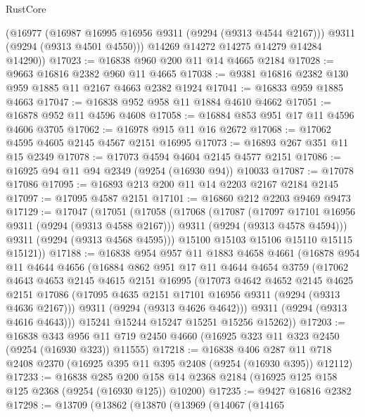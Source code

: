 \begin{lexlean}{RustCore}
\begin{coremodule}
        (@16977
          (@16987 @16995 @16956 @9311 (@9294 (@9313 @4544 @2167)))
          @9311
          (@9294 (@9313 @4501 @4550)))
        @14269
        @14272
        @14275
        @14279
        @14284
        @14290))
@17023 := @16838 @960 @200 @11 @14 @4665 @2184
@17028 := @9663 @16816 @2382 @960 @11 @4665
@17038 := @9381 @16816 @2382 @130 @959 @1885 @11 @2167 @4663 @2382 @1924
@17041 := @16833 @959 @1885 @4663
@17047 := @16838 @952 @958 @11 @1884 @4610 @4662
@17051 := @16878 @952 @11 @4596 @4608
@17058 := @16884 @853 @951 @17 @11 @4596 @4606 @3705
@17062 := @16978 @915 @11 @16 @2672
@17068 := @17062 @4595 @4605 @2145 @4567 @2151 @16995
@17073 := @16893 @267 @351 @11 @15 @2349
@17078 := @17073 @4594 @4604 @2145 @4577 @2151
@17086 := @16925 @94 @11 @94 @2349 (@9254 (@16930 @94)) @10033
@17087 := @17078 @17086
@17095 := @16893 @213 @200 @11 @14 @2203 @2167 @2184 @2145
@17097 := @17095 @4587 @2151
@17101 := @16860 @212 @2203 @9469 @9473
@17129 := @17047
    (@17051
      (@17058
        (@17068
          (@17087
            (@17097 @17101 @16956 @9311 (@9294 (@9313 @4588 @2167)))
            @9311
            (@9294 (@9313 @4578 @4594)))
          @9311
          (@9294 (@9313 @4568 @4595)))
        @15100
        @15103
        @15106
        @15110
        @15115
        @15121))
@17188 := @16838
    @954
    @957
    @11
    @1883
    @4658
    @4661
    (@16878
      @954
      @11
      @4644
      @4656
      (@16884
        @862
        @951
        @17
        @11
        @4644
        @4654
        @3759
        (@17062
          @4643
          @4653
          @2145
          @4615
          @2151
          @16995
          (@17073
            @4642
            @4652
            @2145
            @4625
            @2151
            @17086
            (@17095 @4635 @2151 @17101 @16956 @9311 (@9294 (@9313 @4636 @2167)))
            @9311
            (@9294 (@9313 @4626 @4642)))
          @9311
          (@9294 (@9313 @4616 @4643)))
        @15241
        @15244
        @15247
        @15251
        @15256
        @15262))
@17203 := @16838
    @343
    @956
    @11
    @719
    @2450
    @4660
    (@16925 @323 @11 @323 @2450 (@9254 (@16930 @323)) @11555)
@17218 := @16838
    @406
    @287
    @11
    @718
    @2408
    @2370
    (@16925 @395 @11 @395 @2408 (@9254 (@16930 @395)) @12112)
@17233 := @16838
    @285
    @200
    @158
    @14
    @2368
    @2184
    (@16925 @125 @158 @125 @2368 (@9254 (@16930 @125)) @10200)
@17235 := @9427 @16816 @2382
@17298 := @13709
    (@13862
      (@13870
        (@13969
          (@14067
            (@14165

\end{coremodule}
\end{lexlean}
